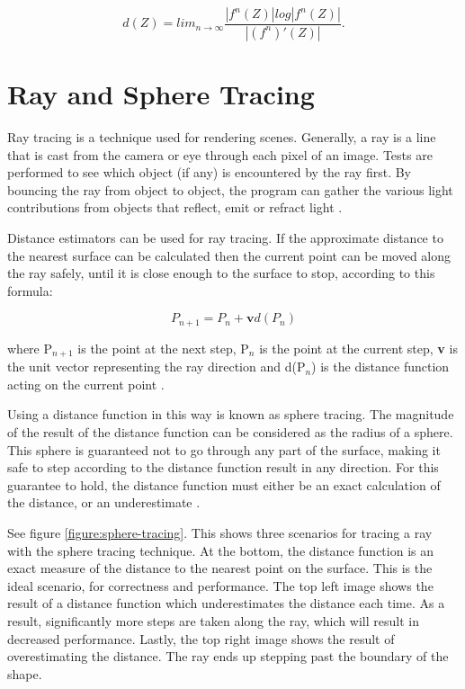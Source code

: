 \begin{equation} \label{equation:final-distance-estimate}
	d(Z) = {lim_{n\rightarrow\infty}}\frac{|f^n(Z)|log|f^n(Z)|}{|(f^n)'(Z)|}.
\end{equation}

\section{Ray and Sphere Tracing}

Ray tracing is a technique used for rendering scenes. Generally, a ray is a line that is cast from the camera or eye through each pixel of an image. Tests are performed to see which object (if any) is encountered by the ray first. By bouncing the ray from object to object, the program can gather the various light contributions from objects that reflect, emit or refract light \cite{haines2019ray}.\newline

Distance estimators can be used for ray tracing. If the approximate distance to the nearest surface can be calculated then the current point can be moved along the ray safely, until it is close enough to the surface to stop, according to this formula:

\begin{equation} \label{equation:sphere-tracing}
	{P_{n+1}} = {P_n} + \textbf{v}d({P_n})
\end{equation}

where P$_{n+1}$ is the point at the next step, P$_n$ is the point at the current step, \textbf{v} is the unit vector representing the ray direction and d(P$_n$) is the distance function acting on the current point \cite{marrs2021ray}.\newline

Using a distance function in this way is known as sphere tracing. The magnitude of the result of the distance function can be considered as the radius of a sphere. This sphere is guaranteed not to go through any part of the surface, making it safe to step according to the distance function result in any direction. For this guarantee to hold, the distance function must either be an exact calculation of the distance, or an underestimate \cite{hart1996sphere}.\newline

See figure \ref{figure:sphere-tracing}. This shows three scenarios for tracing a ray with the sphere tracing technique. At the bottom, the distance function is an exact measure of the distance to the nearest point on the surface. This is the ideal scenario, for correctness and performance. The top left image shows the result of a distance function which underestimates the distance each time. As a result, significantly more steps are taken along the ray, which will result in decreased performance. Lastly, the top right image shows the result of overestimating the distance. The ray ends up stepping past the boundary of the shape.

